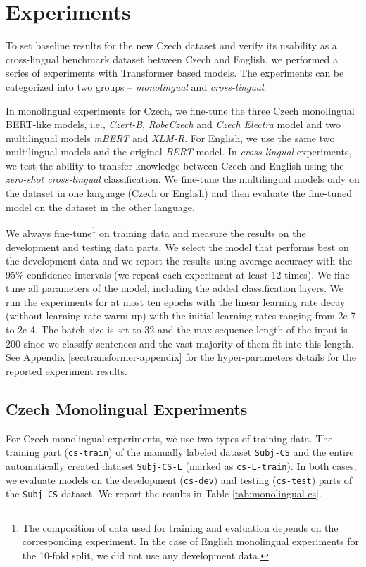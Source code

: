 \documentclass[10pt, a4paper]{article}
\begin{document}
\section{Experiments}
To set baseline results for the new Czech dataset and verify its usability as a cross-lingual benchmark dataset between Czech and English, we performed a series of experiments with Transformer based models. The experiments can be categorized into two groups -- \textit{monolingual} and \textit{cross-lingual}.

\par In monolingual experiments for Czech, we fine-tune the three Czech monolingual BERT-like models, i.e., \textit{Czert-B}, \textit{RobeCzech} and \textit{Czech Electra} model and two multilingual models \textit{mBERT} and \textit{XLM-R}. For English, we use the same two multilingual models and the original \textit{BERT} model. In \textit{cross-lingual} experiments, we test the ability to transfer knowledge between Czech and English using the \textit{zero-shot cross-lingual} classification. We fine-tune the multilingual models only on the dataset in one language (Czech or English) and then evaluate the fine-tuned model on the dataset in the other language.

\par  We always fine-tune\footnote{The composition of data used for training and evaluation depends on the corresponding experiment. In the case of English monolingual experiments for the 10-fold split, we did not use any development data.} on training data and measure the results on the development and testing data parts. We select the model that performs best on the development data and we report the results using average accuracy with the 95\% confidence intervals (we repeat each experiment at least 12 times). We fine-tune all parameters of the model, including the added classification layers. We run the experiments for at most ten epochs with the linear learning rate decay (without learning rate warm-up) with the initial learning rates ranging from 2e-7 to 2e-4. The batch size is set to 32 and the max sequence length of the input is 200 since we classify sentences and the vast majority of them fit into this length. See Appendix \ref{sec:transformer-appendix} for the hyper-parameters details for the reported experiment results.


\subsection{Czech Monolingual Experiments}
\label{sec:czech-monolingual-experiments}
For Czech monolingual experiments, we use two types of training data. The training part (\texttt{cs-train}) of the manually labeled dataset \texttt{Subj-CS} and the entire automatically created dataset \texttt{Subj-CS-L} (marked as \texttt{cs-L-train}). In both cases, we evaluate models on the development (\texttt{cs-dev}) and testing (\texttt{cs-test}) parts of the \texttt{Subj-CS} dataset. We report the results in Table \ref{tab:monolingual-cs}.
\end{document}
